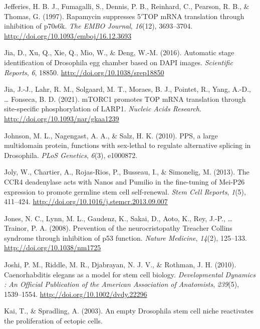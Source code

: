 \documentclass[12pt,twoside]{reedthesis}
\newlength{\cslhangindent}
\newenvironment{cslreferences}%
  {\setlength{\parindent}{0pt}%
  \everypar{\setlength{\hangindent}{\cslhangindent}}\ignorespaces}%
  {\par}
\begin{document}
\begin{cslreferences}
\leavevmode\hypertarget{ref-jefferiesRapamycinSuppressesTOP1997}{}%
Jefferies, H. B. J., Fumagalli, S., Dennis, P. B., Reinhard, C., Pearson, R. B., \& Thomas, G. (1997). Rapamycin suppresses 5\({'}\)TOP mRNA translation through inhibition of p70s6k. \emph{The EMBO Journal}, \emph{16}(12), 3693--3704. \url{http://doi.org/10.1093/emboj/16.12.3693}

\leavevmode\hypertarget{ref-Jia2016b}{}%
Jia, D., Xu, Q., Xie, Q., Mio, W., \& Deng, W.-M. (2016). Automatic stage identification of Drosophila egg chamber based on DAPI images. \emph{Scientific Reports}, \emph{6}, 18850. \url{http://doi.org/10.1038/srep18850}

\leavevmode\hypertarget{ref-jiaMTORC1PromotesTOP2021}{}%
Jia, J.-J., Lahr, R. M., Solgaard, M. T., Moraes, B. J., Pointet, R., Yang, A.-D., \ldots{} Fonseca, B. D. (2021). mTORC1 promotes TOP mRNA translation through site-specific phosphorylation of LARP1. \emph{Nucleic Acids Research}. \url{http://doi.org/10.1093/nar/gkaa1239}

\leavevmode\hypertarget{ref-Johnson2010}{}%
Johnson, M. L., Nagengast, A. A., \& Salz, H. K. (2010). PPS, a large multidomain protein, functions with sex-lethal to regulate alternative splicing in Drosophila. \emph{PLoS Genetics}, \emph{6}(3), e1000872.

\leavevmode\hypertarget{ref-Joly2013f}{}%
Joly, W., Chartier, A., Rojas-Rios, P., Busseau, I., \& Simonelig, M. (2013). The CCR4 deadenylase acts with Nanos and Pumilio in the fine-tuning of Mei-P26 expression to promote germline stem cell self-renewal. \emph{Stem Cell Reports}, \emph{1}(5), 411--424. \url{http://doi.org/10.1016/j.stemcr.2013.09.007}

\leavevmode\hypertarget{ref-jonesPreventionNeurocristopathyTreacher2008}{}%
Jones, N. C., Lynn, M. L., Gaudenz, K., Sakai, D., Aoto, K., Rey, J.-P., \ldots{} Trainor, P. A. (2008). Prevention of the neurocristopathy Treacher Collins syndrome through inhibition of p53 function. \emph{Nature Medicine}, \emph{14}(2), 125--133. \url{http://doi.org/10.1038/nm1725}

\leavevmode\hypertarget{ref-Joshi2010l}{}%
Joshi, P. M., Riddle, M. R., Djabrayan, N. J. V., \& Rothman, J. H. (2010). Caenorhabditis elegans as a model for stem cell biology. \emph{Developmental Dynamics : An Official Publication of the American Association of Anatomists}, \emph{239}(5), 1539--1554. \url{http://doi.org/10.1002/dvdy.22296}

\leavevmode\hypertarget{ref-kaiEmptyDrosophilaStem2003}{}%
Kai, T., \& Spradling, A. (2003). An empty Drosophila stem cell niche reactivates the proliferation of ectopic cells.


\end{cslreferences}
\end{document}
